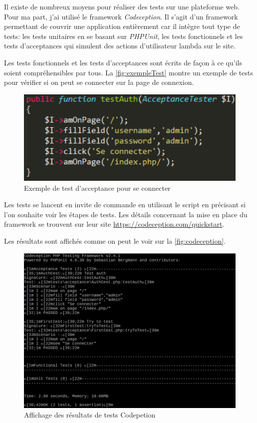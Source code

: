 \documentclass[noposter]{polytech/polytech}
\begin{document}
Il existe de nombreux moyens pour réaliser des tests sur une plateforme web. Pour ma part, j'ai utilisé le framework \textit{Codeception}. Il s'agit d'un framework permettant de couvrir une application entièrement car il intègre tout type de tests: les tests unitaires en se basant sur \textit{PHPUnit}, les tests fonctionnels et les tests d'acceptances qui simulent des actions d'utilisateur lambda sur le site. 

Les tests fonctionnels et les tests d'acceptances sont écrits de façon à ce qu'ils soient compréhensibles par tous. La \autoref{fig:exempleTest} montre un exemple de tests pour vérifier si on peut se connecter sur la page de connexion.

\begin{figure}
	\includegraphics[scale=1]{images/exempleTest}
	\caption{Exemple de test d'acceptance pour se connecter}
	\label{fig:exempleTest}
\end{figure}

Les tests se lancent en invite de commande en utilisant le script  en précisant  si l'on souhaite voir les étapes de tests. Les détails concernant la mise en place du framework se trouvent sur leur site \url{https://codeception.com/quickstart}.

Les résultats sont affichés comme on peut le voir sur la \autoref{fig:codeception}.

\begin{figure}
	\includegraphics[scale=0.5]{images/codeception}
	\caption{Affichage des résultats de tests Codepetion}
	\label{fig:codeception}
\end{figure}
\end{document}
